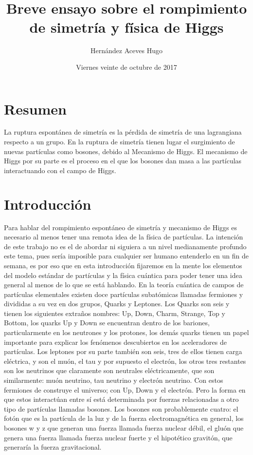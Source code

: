\documentclass[a4paper,12pt,twoside]{book}
\title{Breve ensayo sobre el rompimiento de simetría y física de Higgs}
\author{Hernández Aceves Hugo}
\date{Viernes veinte de octubre de 2017}
\begin{document}
\maketitle
\thispagestyle{empty}
\tableofcontents
{}

\chapter{Resumen}\label{cap.resumen}
La ruptura espontánea de simetría es la pérdida de simetría de una lagrangiana respecto a un grupo. En la ruptura de simetría tienen lugar el surgimiento de nuevas partículas como bosones, debido al Mecanismo de Higgs.
El mecanismo de Higgs por su parte es el proceso en el que los bosones dan masa a las partículas interactuando con el campo de Higgs.
\chapter{Introducción}\label{cap.introduccion}
Para hablar del rompimiento espontáneo de simetría y mecanismo de Higgs es necesario al menos tener una remota idea de la física de partículas. La intención de este trabajo no es el de abordar ni siguiera a un nivel medianamente profundo este tema, pues sería imposible para cualquier ser humano entenderlo en un fin de semana, es por eso que en esta introducción fijaremos en la mente los elementos del modelo estándar de partículas y la física cuántica para poder tener una idea general al menos de lo que se está hablando.
En la teoría cuántica de campos de partículas elementales existen doce partículas subatómicas llamadas fermiones y divididas a su vez en dos grupos, Quarks y Leptones. Los Quarks son seis y tienen los siguientes extraños nombres: Up, Down, Charm, Strange, Top y Bottom, los quarks Up y Down se encuentran dentro de los bariones, particularmente en los neutrones y los protones, los demás quarks tienen un papel importante para explicar los fenómenos descubiertos en los aceleradores de partículas. Los leptones por su parte también son seis, tres de ellos tienen carga eléctrica, y son el muón, el tau y por supuesto el electrón, los otros tres restantes son los neutrinos que claramente son neutrales eléctricamente, que son similarmente: muón neutrino, tau neutrino y electrón neutrino. Con estos fermiones de construye el universo; con Up, Down y el electrón. Pero la forma en que estos interactúan entre sí está determinada por fuerzas relacionadas a otro tipo de partículas llamadas bosones.
Los bosones son probablemente cuatro: el fotón que es la partícula de la luz y de la fuerza electromagnética en general, los bosones w y z que generan una fuerza llamada fuerza nuclear débil, el gluón que genera una fuerza llamada fuerza nuclear fuerte y el hipotético gravitón, que generaría la fuerza gravitacional.
\end{document}
